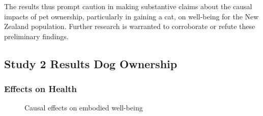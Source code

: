 \documentclass[
  singlecolumn,
  9pt]{article}
\begin{document}
The results thus prompt caution in making substantive claims about the
causal impacts of pet ownership, particularly in gaining a cat, on
well-being for the New Zealand population. Further research is warranted
to corroborate or refute these preliminary findings.

\newpage{}

\subsection{Study 2 Results Dog
Ownership}\label{study-2-results-dog-ownership}

\subsubsection{Effects on Health}\label{effects-on-health-1}

\begin{figure}


\caption{\label{fig-results-health-dogs}Causal effects on embodied
well-being}

\end{figure}%

\newpage{}
\end{document}
